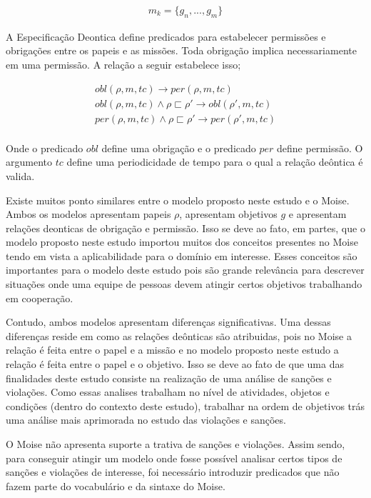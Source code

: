 \documentclass[12pt]{article}
\begin{document}
\begin{eqnarray}\nonumber
	m_k = \{ g_n,...,g_m\}
\end{eqnarray}


A Especificação Deontica define predicados para estabelecer permissões e obrigações entre os papeis e as missões. Toda obrigação implica necessariamente em uma permissão. A relação a seguir estabelece isso; 

\begin{eqnarray}\nonumber
	obl(\rho,m,tc) \to per(\rho,m,tc) \\
	obl(\rho,m,tc) \wedge \rho \sqsubset \rho' \to obl(\rho',m,tc) \\
	per(\rho,m,tc) \wedge \rho \sqsubset \rho' \to per(\rho',m,tc) \\	
\end{eqnarray}

Onde o predicado $obl$ define uma obrigação e o predicado $per$ define permissão. O argumento $tc$ define uma periodicidade de tempo para o qual a relação deôntica é valida. 

Existe muitos ponto similares entre o modelo proposto neste estudo e o Moise. Ambos os modelos apresentam papeis $\rho$, apresentam objetivos $g$ e apresentam relações deonticas de obrigação e permissão. Isso se deve ao fato, em partes, que o modelo proposto neste estudo importou muitos dos conceitos presentes no Moise tendo em vista a aplicabilidade para o domínio em interesse. Esses conceitos são importantes para o modelo deste estudo pois são grande relevância para descrever situações onde uma equipe de pessoas devem atingir certos objetivos trabalhando em cooperação. 

Contudo, ambos modelos apresentam diferenças significativas. Uma dessas diferenças reside em como as relações deônticas são atribuidas, pois no Moise a relação é feita entre o papel e a missão e no modelo proposto neste estudo a relação é feita entre o papel e o objetivo. Isso se deve ao fato de que uma das finalidades deste estudo consiste na realização de uma análise de sanções e violações. Como essas analises trabalham no nível de atividades, objetos e condições (dentro do contexto deste estudo), trabalhar na ordem de objetivos trás uma análise mais aprimorada no estudo das violações e sanções. 

O Moise não apresenta suporte a trativa de sanções e violações. Assim sendo, para conseguir atingir um modelo onde fosse possível analisar certos tipos de sanções e violações de interesse, foi necessário introduzir predicados que não fazem parte do vocabulário e da sintaxe do Moise. 
\end{document}
